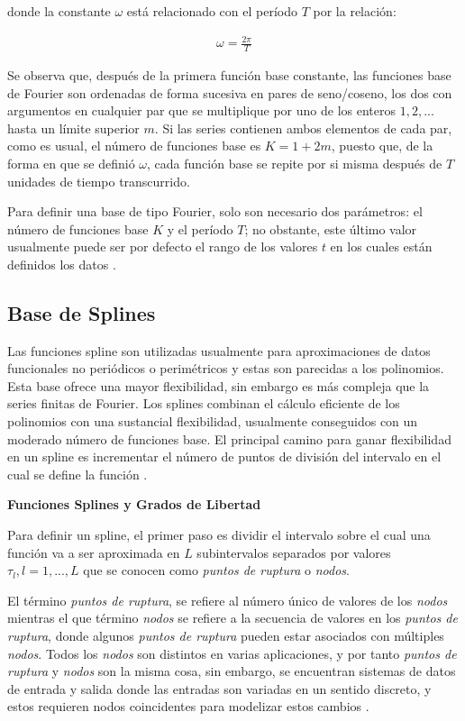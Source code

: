 \documentclass[
]{book}
\begin{document}
donde la constante \(\omega\) está relacionado con el período \(T\) por la relación:

\begin{align*}
    \omega =\frac{2\pi}{T}
\end{align*}

Se observa que, después de la primera función base constante, las funciones base de Fourier son ordenadas de forma sucesiva en pares de seno/coseno, los dos con argumentos en cualquier par que se multiplique por uno de los enteros \(1,2,...\) hasta un límite superior \(m\). Si las series contienen ambos elementos de cada par, como es usual, el número de funciones base es \(K=1+2m\), puesto que, de la forma en que se definió \(\omega\), cada función base se repite por si misma después de \(T\) unidades de tiempo transcurrido.

Para definir una base de tipo Fourier, solo son necesario dos parámetros: el número de funciones base \(K\) y el período \(T\); no obstante, este último valor usualmente puede ser por defecto el rango de los valores \(t\) en los cuales están definidos los datos \citep{programsay}.

\hypertarget{base-de-splines}{%
\subsection*{Base de Splines}\label{base-de-splines}}

Las funciones spline son utilizadas usualmente para aproximaciones de datos funcionales no periódicos o perimétricos y estas son parecidas a los polinomios. Esta base ofrece una mayor flexibilidad, sin embargo es más compleja que la series finitas de Fourier. Los splines combinan el cálculo eficiente de los polinomios con una sustancial flexibilidad, usualmente conseguidos con un moderado número de funciones base. El principal camino para ganar flexibilidad en un spline es incrementar el número de puntos de división del intervalo en el cual se define la función \citep{ramsay}.

\textbf{Funciones Splines y Grados de Libertad}

Para definir un spline, el primer paso es dividir el intervalo sobre el cual una función va a ser aproximada en \(L\) subintervalos separados por valores \(\tau_l, l=1,...,L\) que se conocen como \emph{puntos de ruptura} o \emph{nodos}.

El término \emph{puntos de ruptura}, se refiere al número único de valores de los \emph{nodos} mientras el que término \emph{nodos} se refiere a la secuencia de valores en los \emph{puntos de ruptura}, donde algunos \emph{puntos de ruptura} pueden estar asociados con múltiples \emph{nodos}. Todos los \emph{nodos} son distintos en varias aplicaciones, y por tanto \emph{puntos de ruptura} y \emph{nodos} son la misma cosa, sin embargo, se encuentran sistemas de datos de entrada y salida donde las entradas son variadas en un sentido discreto, y estos requieren nodos coincidentes para modelizar estos cambios \citep{ramsay}.
\end{document}
